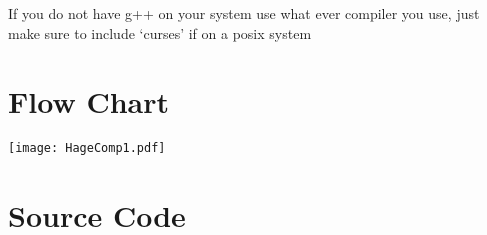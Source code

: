 \documentclass[a4paper, 12pt] {report}
\begin{document}
If you do not have g++ on your system use what ever compiler you use, just make sure to 
include `curses' if on a posix system

\pagebreak

\section*{Flow Chart}
\texttt{[image: HageComp1.pdf]}
\pagebreak

\section*{Source Code}








\end{document}
